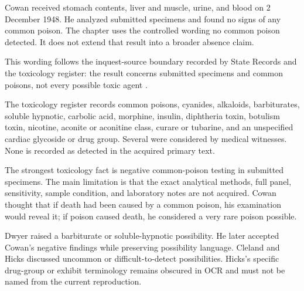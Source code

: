 Cowan received stomach contents, liver and muscle, urine, and blood on 2 December 1948. He analyzed submitted specimens and found no signs of any common poison. The chapter uses the controlled wording no common poison detected. It does not extend that result into a broader absence claim.

This wording follows the inquest-source boundary recorded by State Records and the toxicology register: the result concerns submitted specimens and common poisons, not every possible toxic agent \parencite{src-src-0003,doc-doc-0001}.

The toxicology register records common poisons, cyanides, alkaloids, barbiturates, soluble hypnotic, carbolic acid, morphine, insulin, diphtheria toxin, botulism toxin, nicotine, aconite or aconitine class, curare or tubarine, and an unspecified cardiac glycoside or drug group. Several were considered by medical witnesses. None is recorded as detected in the acquired primary text.

The strongest toxicology fact is negative common-poison testing in submitted specimens. The main limitation is that the exact analytical methods, full panel, sensitivity, sample condition, and laboratory notes are not acquired. Cowan thought that if death had been caused by a common poison, his examination would reveal it; if poison caused death, he considered a very rare poison possible.

Dwyer raised a barbiturate or soluble-hypnotic possibility. He later accepted Cowan's negative findings while preserving possibility language. Cleland and Hicks discussed uncommon or difficult-to-detect possibilities. Hicks's specific drug-group or exhibit terminology remains obscured in OCR and must not be named from the current reproduction.

